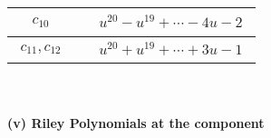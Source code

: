 \documentclass[1p]{elsarticle_modified}
\theoremstyle{definition}
\begin{document}
\begin{tabular}{m{50pt}|m{274pt}}
\hline $$\begin{aligned}c_{10}\end{aligned}$$&$\begin{aligned}
&u^{20}- u^{19}+\cdots-4 u-2
\end{aligned}$\\
\hline $$\begin{aligned}c_{11},c_{12}\end{aligned}$$&$\begin{aligned}
&u^{20}+u^{19}+\cdots+3 u-1
\end{aligned}$\\
\hline
\end{tabular}\\~\\
\newpage\renewcommand{\arraystretch}{1}
\flushleft \textbf{(v) Riley Polynomials at the component}\newline \\
\end{document}
